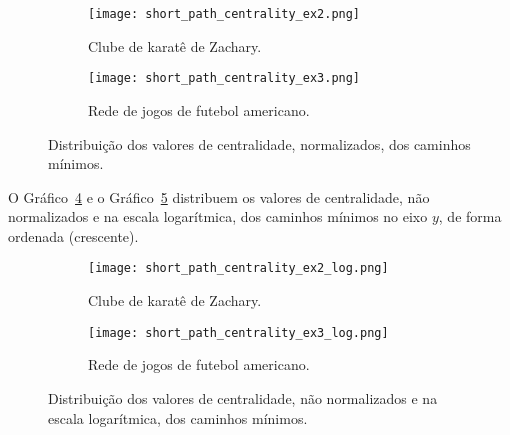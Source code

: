 \begin{figure}[!htb]
    \centering
    \begin{subfigure}{.5\textwidth}
        \centering
        \texttt{[image: short\_path\_centrality\_ex2.png]}
        \caption{Clube de karatê de Zachary.}
        \label{sec5:short_path_centrality_ex2}
    \end{subfigure}%
    \begin{subfigure}{.5\textwidth}
        \centering
        \texttt{[image: short\_path\_centrality\_ex3.png]}
        \caption{Rede de jogos de futebol americano.}
        \label{sec5:short_path_centrality_ex3}
    \end{subfigure}
    \caption{Distribuição dos valores de centralidade, normalizados, dos caminhos mínimos.}
    \label{sec5:grafico_centralidade_normalizados}
\end{figure}

O Gráfico~\ref{sec5:short_path_centrality_ex2_log} e o Gráfico~\ref{sec5:short_path_centrality_ex3_log} distribuem os valores de centralidade, não normalizados e na escala logarítmica, dos caminhos mínimos no eixo $y$, de forma ordenada (crescente).

\begin{figure}[!htb]
    \centering
    \begin{subfigure}{.5\textwidth}
        \centering
        \texttt{[image: short\_path\_centrality\_ex2\_log.png]}
        \caption{Clube de karatê de Zachary.}
        \label{sec5:short_path_centrality_ex2_log}
    \end{subfigure}%
    \begin{subfigure}{.5\textwidth}
        \centering
        \texttt{[image: short\_path\_centrality\_ex3\_log.png]}
        \caption{Rede de jogos de futebol americano.}
        \label{sec5:short_path_centrality_ex3_log}
    \end{subfigure}
    \caption{Distribuição dos valores de centralidade, não normalizados e na escala logarítmica, dos caminhos mínimos.}
    \label{sec5:grafico_centralidade_normalizados}
\end{figure}
